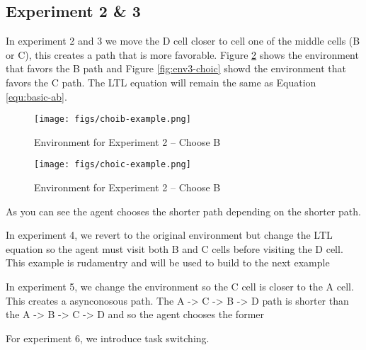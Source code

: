 \documentclass[letter paper, 10 pt, conference]{ieeeconf}
\begin{document}
\subsection{Experiment 2 \& 3}
In experiment 2 and 3 we move the D cell closer to cell one of the middle cells (B or C), this creates a path that is more favorable. Figure \ref{fig:env2-choib} shows the environment that favors the B path and Figure \ref{fig:env3-choic} showd the environment that favors the C path. The LTL equation will remain the same as Equation \ref{equ:basic-ab}.

\begin{figure}[htb]
  \centering
  \texttt{[image: figs/choib-example.png]}
  \caption{Environment for Experiment 2 -- Choose B}
  \label{fig:env2-choib}
\end{figure}

\begin{figure}[htb]
  \centering
  \texttt{[image: figs/choic-example.png]}
  \caption{Environment for Experiment 2 -- Choose B}
  \label{fig:env2-choib}
\end{figure}


As you can see the agent chooses the shorter path depending on the shorter path.


In experiment 4, we revert to the original environment but change the LTL equation so the agent must visit both B and C cells before visiting the D cell. This example is rudamentry and will be used to build to the next example

In experiment 5, we change the environment so the C cell is closer to the A cell. This creates a asynconosous path. The A -> C -> B -> D path is shorter than the A -> B -> C -> D and so the agent chooses the former

For experiment 6, we introduce task switching.
\end{document}
